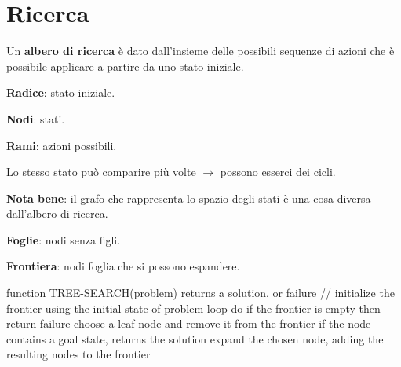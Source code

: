 \newpage

\section{Ricerca}

Un \textbf{albero di ricerca} è dato dall'insieme delle possibili sequenze di
azioni che è possibile applicare a partire da uno stato iniziale.

\textbf{Radice}: stato iniziale.

\textbf{Nodi}: stati.

\textbf{Rami}: azioni possibili.

Lo stesso stato può comparire più volte $\rightarrow$ possono esserci dei cicli.

\textbf{Nota bene}: il grafo che rappresenta lo spazio degli stati è una cosa
diversa dall'albero di ricerca.

\textbf{Foglie}: nodi senza figli.

\textbf{Frontiera}: nodi foglia che si possono espandere.


function TREE-SEARCH(problem) returns a solution, or failure
// initialize the frontier using the initial state of problem
loop do
  if the frontier is empty then return failure
  choose a leaf node and remove it from the frontier
  if the node contains a goal state, returns the solution
  expand the chosen node, adding the resulting nodes to the frontier







